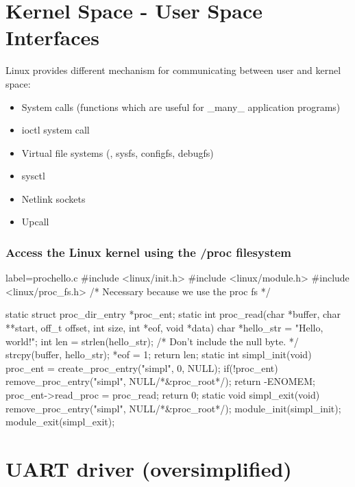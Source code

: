 \documentclass[xcolor=dvipsnames,compress]{beamer}
\begin{document}
\section[ABI]{Kernel Space - User Space Interfaces}
\begin{frame}
    Linux provides different mechanism for communicating between user and kernel space:
    \begin{itemize}
    \item System calls (functions which are useful for \_many\_ application programs)
    \item ioctl system call
    \item Virtual file systems (, sysfs, configfs, debugfs)
    \item sysctl
    \item Netlink sockets
    \item Upcall
    \end{itemize}
\end{frame}

\begin{frame}[fragile]
    \frametitle{Access the Linux kernel using the /proc filesystem}
    \begin{ccode*}{label=prochello.c} 
    #include <linux/init.h>
    #include <linux/module.h>
    #include <linux/proc_fs.h>  /* Necessary because we use the proc fs */

    static struct proc_dir_entry *proc_ent;
    static int proc_read(char *buffer, char **start, off_t offset, int size, int *eof, void *data)
    {
      char *hello_str = "Hello, world!\n";
      int len = strlen(hello_str); /* Don't include the null byte. */
      strcpy(buffer, hello_str);
      *eof = 1;
      return len;
    }
    static int simpl_init(void)
    {
      proc_ent = create_proc_entry("simpl", 0, NULL);
      if(!proc_ent){
        remove_proc_entry("simpl", NULL/*&proc_root*/);
        return -ENOMEM;
      }
      proc_ent->read_proc = proc_read;
      return 0;
    }
    static void simpl_exit(void)
    {
      remove_proc_entry("simpl", NULL/*&proc_root*/);
    }
    module_init(simpl_init);
    module_exit(simpl_exit);
    \end{ccode*}
\end{frame}

\section[example]{UART driver (oversimplified)}
\end{document}
